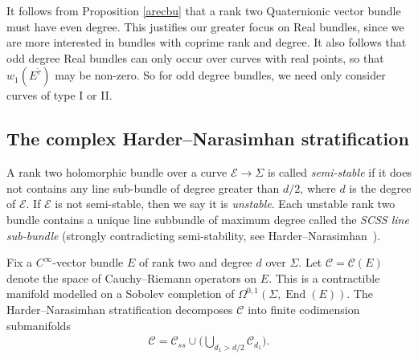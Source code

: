 \documentclass[10pt,a4paper]{amsart}
\numberwithin{equation}{section}
\begin{document}
\begin{Remark}\label{quatnotint}
It follows from Proposition \ref{arecbu} that a rank two Quaternionic vector bundle must have even degree. This justif\/ies our greater focus on Real bundles, since we are more interested in bundles with coprime rank and degree. It also follows that odd degree Real bundles can only occur over curves with real points, so that $w_1(E^{\tilde{\tau}})$ may be non-zero. So for odd degree bundles, we need only consider curves of type I or II.
\end{Remark}

\subsection{The complex Harder--Narasimhan stratif\/ication}\label{HNstratC}
A rank two holomorphic bundle over a curve ${\mathcal E} \rightarrow \Sigma$ is called \emph{semi-stable} if it does not contains any line sub-bundle of degree greater than $d/2$, where $d$ is the degree of ${\mathcal E}$. If ${\mathcal E}$ is not semi-stable, then we say it is \emph{unstable}. Each unstable rank two bundle contains a unique line subbundle of maximum degree called the \emph{SCSS line sub-bundle} (strongly contradicting semi-stability, see Harder--Narasimhan~\cite{HN}).

Fix a $C^{\infty}$-vector bundle $E$ of rank two and degree $d$ over $\Sigma$. Let ${\mathcal C} ={\mathcal C}(E)$ denote the space of Cauchy--Riemann operators on $E$. This is a contractible manifold modelled on a Sobolev completion of $\Omega^{0,1}(\Sigma,\operatorname{End}(E))$. The Harder--Narasimhan stratif\/ication decomposes ${\mathcal C}$ into f\/inite codimension submanifolds
\begin{gather}\label{HNstrateqn}
 {\mathcal C} = {\mathcal C}_{ss} \cup \bigg( \bigcup_{d_1 > d/2} {\mathcal C}_{d_1}\bigg).
\end{gather}
\end{document}
